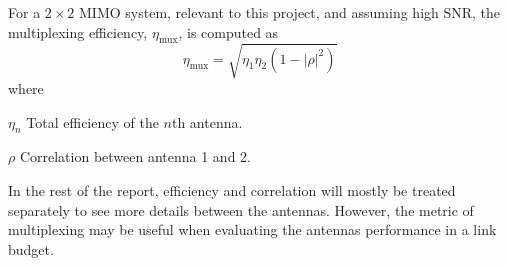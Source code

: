 For a $2\times2$ MIMO system, relevant to this project, and assuming high SNR, the multiplexing efficiency, $\eta_{\text{mux}}$, is computed as \cite{tian2011multiplexing}
\begin{equation} %
    \eta_{\text{mux}} = \sqrt{\eta_1 \eta_2 (1 - |\rho|^2)}
\end{equation}
where
\begin{where}
\item[$\eta_n$] Total efficiency of the $n$th antenna.
\item[$\rho$] Correlation between antenna 1 and 2.
\end{where}

In the rest of the report, efficiency and correlation will mostly be treated separately to see more details between the antennas. However, the metric of multiplexing may be useful when evaluating the antennas performance in a link budget.
